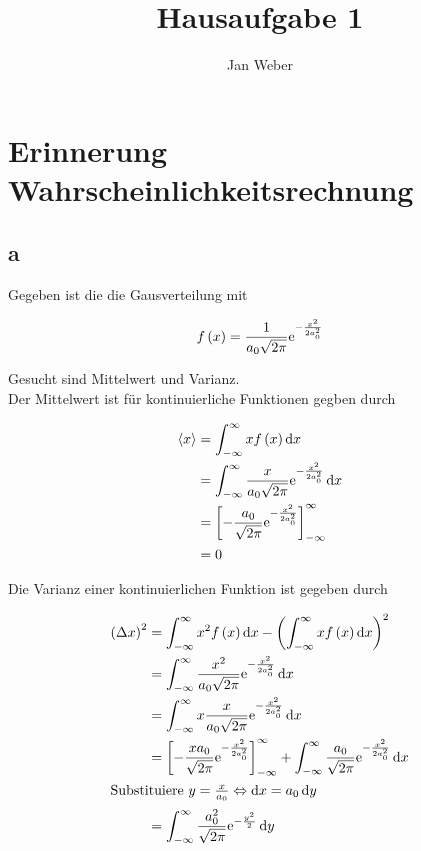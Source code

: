 \documentclass[11pt, ngerman, fleqn, DIV=15, headinclude]{scrartcl}
\title{Hausaufgabe 1}
\author{
    Jan Weber
}
\begin{document}
\maketitle

\section{Erinnerung Wahrscheinlichkeitsrechnung}

\subsection{a}

Gegeben ist die die Gausverteilung mit

\begin{align*}
  f\left( x \right)=\frac1{a_0\sqrt{2\pi}}\mathrm e^{-\frac{x^2}{2a_0^2}}
\end{align*}

Gesucht sind Mittelwert und Varianz.\\
Der Mittelwert ist für kontinuierliche Funktionen gegben durch

\begin{align*}
  \langle x \rangle	&=\int_{-\infty}^{\infty}xf\left( x \right)\mathop{}\!\mathrm d x\\
		&=\int_{-\infty}^{\infty}\frac{x}{a_0\sqrt{2\pi}}\mathrm e^{-\frac{x^2}{2a_0^2}}\mathop{}\!\mathrm d x\\
		&=\left[-\frac{a_0}{\sqrt{2\pi}}\mathrm e^{-\frac{x^2}{2a_0^2}}\right]_{-\infty}^{\infty}\\
		&=0
\end{align*}

Die Varianz einer kontinuierlichen Funktion ist gegeben durch

\begin{align*}
  \del{\Delta x}^2	&=\int_{-\infty}^{\infty}x^2f\del{x}\dif x-\del{\int_{-\infty}^{\infty}xf\del{x}\dif x}^2\\
  					&=\int_{-\infty}^{\infty}\frac{x^2}{a_0\sqrt{2\pi}}\eup^{-\frac{x^2}{2a_0^2}}\dif x\\
  					&=\int_{-\infty}^{\infty}x\frac{x}{a_0\sqrt{2\pi}}\eup^{-\frac{x^2}{2a_0^2}}\dif x\\
  					&=\left[-\frac{xa_0}{\sqrt{2\pi}}\eup^{-\frac{x^2}{2a_0^2}}\right]_{-\infty}^{\infty} + \int_{-\infty}^{\infty}\frac{a_0}{\sqrt{2\pi}}\eup^{-\frac{x^2}{2a_0^2}}\dif x\\
  \intertext{%
  	Substituiere $y=\frac{x}{a_0}\Leftrightarrow\dif x=a_0\dif y$
  }
  					&=\int_{-\infty}^{\infty}\frac{a_0^2}{\sqrt{2\pi}}\eup^{-\frac{y^2}{2}}\dif y\\
\end{align*}
\end{document}
